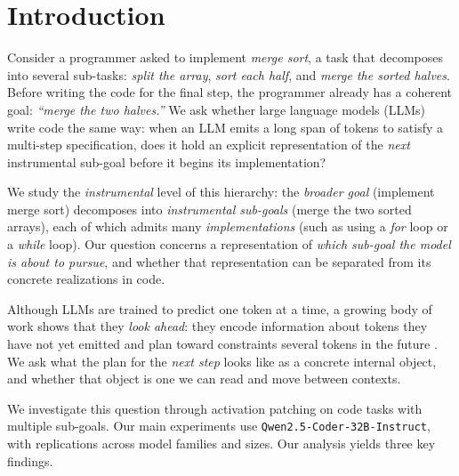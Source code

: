 \section{Introduction}
\label{sec:intro}




Consider a programmer asked to implement \emph{merge sort}, a task that decomposes into several sub-tasks: \emph{split the array}, \emph{sort each half}, and \emph{merge the sorted halves}. Before writing the code for the final step, the programmer already has a coherent goal: \textit{``merge the two halves.''} We ask whether large language models (LLMs) write code the same way: when an LLM emits a long span of tokens to satisfy a multi-step specification, does it hold an explicit representation of the \emph{next} instrumental sub-goal before it begins its implementation?


We study the \emph{instrumental} level of this hierarchy: the \emph{broader goal} (implement merge sort) decomposes into \emph{instrumental sub-goals} (merge the two sorted arrays), each of which admits many \emph{implementations} (such as using a \emph{for} loop or a \emph{while} loop). Our question concerns a representation of \emph{which sub-goal the model is about to pursue}, and whether that representation can be separated from its concrete realizations in code.

Although LLMs are trained to predict one token at a time, a growing body of work shows that they \emph{look ahead}: they encode information about tokens they have not yet emitted \citep{pal2023futurelens} and plan toward constraints several tokens in the future \citep{lindsey2025biology}. We ask what the plan for the \emph{next step} looks like as a concrete internal object, and whether that object is one we can read and move between contexts.

We investigate this question through activation patching on code tasks with multiple sub-goals. Our main experiments use \texttt{Qwen2.5-Coder-32B-Instruct}, with replications across model families and sizes. Our analysis yields three key findings.

